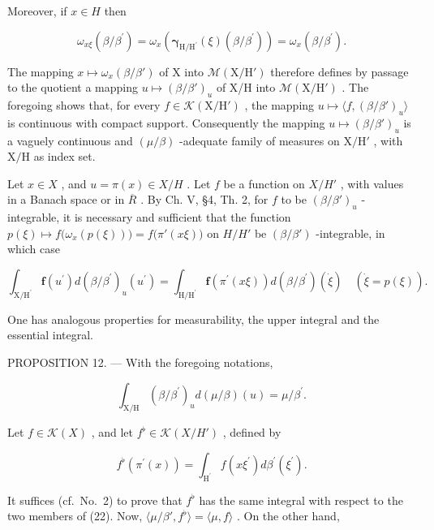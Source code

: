 Moreover, if \(x \in H\) then

\[
\omega_ {x \xi} (\beta / \beta^ {\prime}) = \omega_ {x} \left(\boldsymbol {\gamma} _ {\mathrm{H} / \mathrm{H} ^ {\prime}} (\xi) (\beta / \beta^ {\prime})\right) = \omega_ {x} (\beta / \beta^ {\prime}).
\]

The mapping \(x \mapsto \omega_x(\beta/\beta')\) of X into \(\mathcal{M}(\mathrm{X}/\mathrm{H}')\) therefore defines by passage to the quotient a mapping \(u \mapsto (\beta/\beta')_u\) of X/H into \(\mathcal{M}(\mathrm{X}/\mathrm{H}')\) . The foregoing shows that, for every \(f \in \mathcal{K}(\mathrm{X}/\mathrm{H}')\) , the mapping \(u \mapsto \langle f, (\beta/\beta')_u \rangle\) is continuous with compact support. Consequently the mapping \(u \mapsto (\beta/\beta')_u\) is a vaguely continuous and \((\mu/\beta)\) -adequate family of measures on \(\mathrm{X}/\mathrm{H}'\) , with \(\mathrm{X}/\mathrm{H}\) as index set.

Let \(x \in X\) , and \(u = \pi(x) \in X/H\) . Let \(f\) be a function on \(X/H'\) , with values in a Banach space or in \(\overline{R}\) . By Ch. V, §4, Th. 2, for \(f\) to be \((\beta/\beta')_u\) -integrable, it is necessary and sufficient that the function \(p(\xi) \mapsto f\big(\omega_x(p(\xi))\big) = f\big(\pi'(x\xi)\big)\) on \(H/H'\) be \((\beta/\beta')\) -integrable, in which case

\[
\int_ {\mathrm{X} / \mathrm{H} ^ {\prime}} \mathbf {f} (u ^ {\prime}) d (\beta / \beta^ {\prime}) _ {u} (u ^ {\prime}) = \int_ {\mathrm{H} / \mathrm{H} ^ {\prime}} \mathbf {f} \left(\pi^ {\prime} (x \xi)\right) d (\beta / \beta^ {\prime}) (\dot {\xi}) \quad \left(\dot {\xi} = p (\xi)\right).\tag{21}
\]

One has analogous properties for measurability, the upper integral and the essential integral.

PROPOSITION 12. --- With the foregoing notations,

\[
\int_ {\mathrm{X/H}} (\beta / \beta^ {\prime}) _ {u} d (\mu / \beta) (u) = \mu / \beta^ {\prime}.\tag{22}
\]

Let \(f \in \mathcal{K}(X)\) , and let \(f^{\flat} \in \mathcal{K}(X/H')\) , defined by

\[
f ^ {\flat} \left(\pi^ {\prime} (x)\right) = \int_ {\mathrm{H} ^ {\prime}} f \left(x \xi^ {\prime}\right) d \beta^ {\prime} \left(\xi^ {\prime}\right).
\]

It suffices (cf.~No.~2) to prove that \(f^{\flat}\) has the same integral with respect to the two members of (22). Now, \(\langle \mu / \beta', f^{\flat} \rangle = \langle \mu, f \rangle\) . On the other hand,

